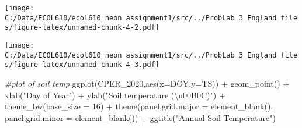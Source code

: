 \documentclass[
]{article}
\newenvironment{Shaded}{\begin{snugshade}}{\end{snugshade}}
\newcommand{\AttributeTok}[1]{\textcolor[rgb]{0.77,0.63,0.00}{#1}}
\newcommand{\CommentTok}[1]{\textcolor[rgb]{0.56,0.35,0.01}{\textit{#1}}}
\newcommand{\DecValTok}[1]{\textcolor[rgb]{0.00,0.00,0.81}{#1}}
\newcommand{\FunctionTok}[1]{\textcolor[rgb]{0.00,0.00,0.00}{#1}}
\newcommand{\NormalTok}[1]{#1}
\newcommand{\SpecialCharTok}[1]{\textcolor[rgb]{0.00,0.00,0.00}{#1}}
\newcommand{\StringTok}[1]{\textcolor[rgb]{0.31,0.60,0.02}{#1}}
\begin{document}
\texttt{[image: C:/Data/ECOL610/ecol610\_neon\_assignment1/src/../ProbLab\_3\_England\_files/figure-latex/unnamed-chunk-4-2.pdf]}

\begin{Shaded}
\end{Shaded}

\texttt{[image: C:/Data/ECOL610/ecol610\_neon\_assignment1/src/../ProbLab\_3\_England\_files/figure-latex/unnamed-chunk-4-3.pdf]}

\begin{Shaded}
\begin{Highlighting}[]
\CommentTok{\#plot of soil temp}
\FunctionTok{ggplot}\NormalTok{(CPER\_2020,}\FunctionTok{aes}\NormalTok{(}\AttributeTok{x=}\NormalTok{DOY,}\AttributeTok{y=}\NormalTok{TS)) }\SpecialCharTok{+} \FunctionTok{geom\_point}\NormalTok{() }\SpecialCharTok{+} 
    \FunctionTok{xlab}\NormalTok{(}\StringTok{"Day of Year"}\NormalTok{) }\SpecialCharTok{+} 
    \FunctionTok{ylab}\NormalTok{(}\StringTok{"Soil temperature (\textbackslash{}u00B0C)"}\NormalTok{) }\SpecialCharTok{+}
    \FunctionTok{theme\_bw}\NormalTok{(}\AttributeTok{base\_size =} \DecValTok{16}\NormalTok{) }\SpecialCharTok{+} \FunctionTok{theme}\NormalTok{(}\AttributeTok{panel.grid.major =} \FunctionTok{element\_blank}\NormalTok{(), }\AttributeTok{panel.grid.minor =} \FunctionTok{element\_blank}\NormalTok{()) }\SpecialCharTok{+} \FunctionTok{ggtitle}\NormalTok{(}\StringTok{"Annual Soil Temperature"}\NormalTok{)}
\end{Highlighting}
\end{Shaded}
\end{document}

